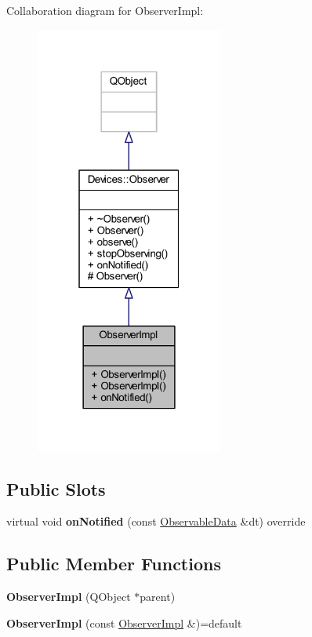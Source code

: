 Collaboration diagram for Observer\+Impl\+:\nopagebreak
\begin{figure}[H]
\begin{center}
\leavevmode
\includegraphics[width=175pt]{d4/de4/class_observer_impl__coll__graph}
\end{center}
\end{figure}
\subsection*{Public Slots}
\begin{DoxyCompactItemize}
\item 
\mbox{\label{class_observer_impl_a1080d75c918e6d957749d21fe91b4ab8}} 
virtual void {\bfseries on\+Notified} (const \hyperlink{class_devices_1_1_observable_data}{Observable\+Data} \&dt) override
\end{DoxyCompactItemize}
\subsection*{Public Member Functions}
\begin{DoxyCompactItemize}
\item 
\mbox{\label{class_observer_impl_a9fa47173043c11d1c3aa064080adebb4}} 
{\bfseries Observer\+Impl} (Q\+Object $\ast$parent)
\item 
\mbox{\label{class_observer_impl_af8f93e3842c3d9f8d9bd9cbf6c2964a3}} 
{\bfseries Observer\+Impl} (const \hyperlink{class_observer_impl}{Observer\+Impl} \&)=default
\end{DoxyCompactItemize}
